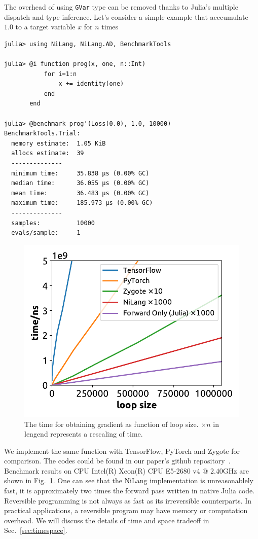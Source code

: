 \documentclass[aps,twocolumn,longbibliography,english,superscriptaddress]{revtex4-1}
\newcommand{\<}{\langle}
\renewcommand{\>}{\rangle}
\newcommand{\Fig}[1]{Fig.~\ref{#1}}
\newcommand{\Sec}[1]{Sec.~\ref{#1}}
\theoremstyle{definition}\newtheorem{definition}{\textit{Definition}}
\begin{document}
The overhead of using \texttt{GVar} type can be removed thanks to Julia's multiple dispatch and type inference. Let's consider a simple example that acccumulate $1.0$ to a target variable $x$ for $n$ times

\begin{minipage}{.44\textwidth}
\begin{lstlisting}
julia> using NiLang, NiLang.AD, BenchmarkTools

julia> @i function prog(x, one, n::Int)
           for i=1:n
               x += identity(one)
           end
       end

julia> @benchmark prog'(Loss(0.0), 1.0, 10000)
BenchmarkTools.Trial: 
  memory estimate:  1.05 KiB
  allocs estimate:  39
  --------------
  minimum time:     35.838 μs (0.00% GC)
  median time:      36.055 μs (0.00% GC)
  mean time:        36.483 μs (0.00% GC)
  maximum time:     185.973 μs (0.00% GC)
  --------------
  samples:          10000
  evals/sample:     1
\end{lstlisting}
\end{minipage}

\begin{figure}
    \centerline{\includegraphics[width=0.9\columnwidth,trim={0 0cm 0 0},clip]{images/fig3.pdf}}
    \caption{The time for obtaining gradient as function of loop size. $\times n$ in lengend represents a rescaling of time.}\label{fig:benchmark}
\end{figure}
We implement the same function with TensorFlow, PyTorch and Zygote for comparison. The codes could be found in our paper's github repository~\cite{benchmark}. Benchmark results on CPU Intel(R) Xeon(R) CPU E5-2680 v4 @ 2.40GHz are shown in \Fig{fig:benchmark}.
One can see that the NiLang implementation is unreasonablely fast, it is approximately two times the forward pass written in native Julia code.
Reversible programming is not always as fast as its irreversible counterparts. In practical applications, a reversible program may have memory or computation overhead. We will discuss the details of time and space tradeoff in \Sec{sec:timespace}.
\end{document}
